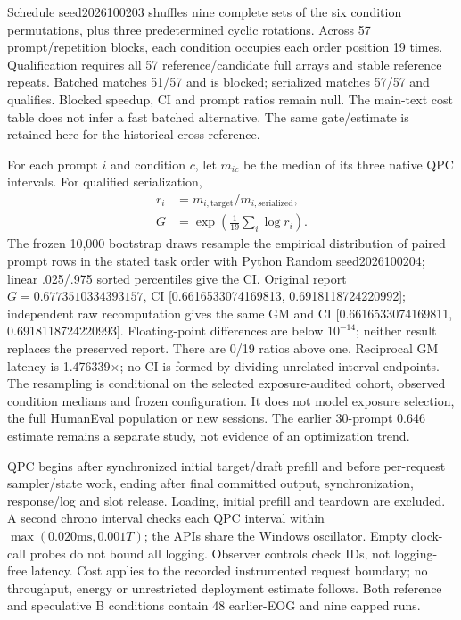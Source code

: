 Schedule seed2026100203 shuffles nine complete sets of the six condition permutations, plus three predetermined cyclic rotations. Across 57 prompt/repetition blocks, each condition occupies each order position 19 times. Qualification requires all 57 reference/candidate full arrays and stable reference repeats. Batched matches 51/57 and is blocked; serialized matches 57/57 and qualifies. Blocked speedup, CI and prompt ratios remain null. The main-text cost table does not infer a fast batched alternative. The same gate/estimate is retained here for the historical cross-reference.


For each prompt $i$ and condition $c$, let $m_{ic}$ be the median of its three native QPC intervals. For qualified serialization,
\[
\begin{aligned}
r_i&=m_{i,\mathrm{target}}/m_{i,\mathrm{serialized}},\\
G&=\exp\!\left(\frac1{19}\sum_i\log r_i\right).\end{aligned}
\]
The frozen 10,000 bootstrap draws resample the empirical distribution of paired prompt rows in the stated task order with Python Random seed2026100204; linear .025/.975 sorted percentiles give the CI. Original report $G=0.6773510334393157$, CI [0.6616533074169813, 0.6918118724220992]; independent raw recomputation gives the same GM and CI [0.6616533074169811, 0.6918118724220993]. Floating-point differences are below $10^{-14}$; neither result replaces the preserved report. There are 0/19 ratios above one. Reciprocal GM latency is 1.476339$\times$; no CI is formed by dividing unrelated interval endpoints. The resampling is conditional on the selected exposure-audited cohort, observed condition medians and frozen configuration. It does not model exposure selection, the full HumanEval population or new sessions. The earlier 30-prompt 0.646 estimate remains a separate study, not evidence of an optimization trend.

QPC begins after synchronized initial target/draft prefill and before per-request sampler/state work, ending after final committed output, synchronization, response/log and slot release. Loading, initial prefill and teardown are excluded. A second chrono interval checks each QPC interval within $\max(0.020\mathrm{ms},0.001T)$; the APIs share the Windows oscillator. Empty clock-call probes do not bound all logging. Observer controls check IDs, not logging-free latency. Cost applies to the recorded instrumented request boundary; no throughput, energy or unrestricted deployment estimate follows. Both reference and speculative B conditions contain 48 earlier-EOG and nine capped runs.

